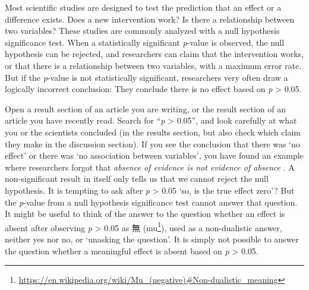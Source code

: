 \documentclass[
  oneside]{krantz}
\renewcommand{\href}[2]{#2\footnote{\url{#1}}}
\begin{document}
Most scientific studies are designed to test the prediction that an effect or a difference exists. Does a new intervention work? Is there a relationship between two variables? These studies are commonly analyzed with a null hypothesis significance test. When a statistically significant \emph{p}-value is observed, the null hypothesis can be rejected, and researchers can claim that the intervention works, or that there is a relationship between two variables, with a maximum error rate. But if the \emph{p}-value is not statistically significant, researchers very often draw a logically incorrect conclusion: They conclude there is no effect based on \emph{p} \textgreater{} 0.05.

Open a result section of an article you are writing, or the result section of an article you have recently read. Search for ``\emph{p} \textgreater{} 0.05'', and look carefully at what you or the scientists concluded (in the results section, but also check which claim they make in the discussion section). If you see the conclusion that there was `no effect' or there was `no association between variables', you have found an example where researchers forgot that \emph{absence of evidence is not evidence of absence} \citep{altman_statistics_1995}. A non-significant result in itself only tells us that we cannot reject the null hypothesis. It is tempting to ask after \emph{p} \textgreater{} 0.05 `so, is the true effect zero'? But the \emph{p}-value from a null hypothesis significance test cannot answer that question. It might be useful to think of the answer to the question whether an effect is absent after observing \emph{p} \textgreater{} 0.05 as 無 (\href{https://en.wikipedia.org/wiki/Mu_(negative)\#Non-dualistic_meaning}{mu}), used as a non-dualistic answer, neither yes nor no, or `unasking the question'. It is simply not possible to answer the question whether a meaningful effect is absent based on \emph{p} \textgreater{} 0.05.
\end{document}
